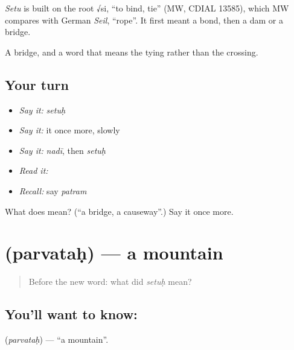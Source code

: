 \begin{cousinweb}
\emph{Setu} is built on the root √si, \textquotedblleft{}to bind, tie\textquotedblright{} (MW, CDIAL 13585), which MW compares with German \emph{Seil}, \textquotedblleft{}rope\textquotedblright{}. It first meant a bond, then a dam or a bridge.
\end{cousinweb}

\begin{grammarlens}[title={What you've built}]
A bridge, and a word that means the tying rather than the crossing.
\end{grammarlens}

\subsection*{Your turn}
\begin{itemize}
\raggedright
  \item \emph{Say it:} \emph{setuḥ}
  \item \emph{Say it:} it once more, slowly
  \item \emph{Say it:} \emph{nadī}, then \emph{setuḥ}
  \item \emph{Read it:} \textbf{}
  \item \emph{Recall:} say \emph{patram}
\end{itemize}

\begin{tcolorbox}[breakable,colback=teal!4,colframe=teal!35!black,title={Before you move on}]
What does  mean? (\textquotedblleft{}a bridge, a causeway\textquotedblright{}.) Say it once more.
\end{tcolorbox}
\section[\texorpdfstring{\sk{पर्वतः} (parvataḥ)}{पर्वतः (parvataḥ)}]{ (parvataḥ) — a mountain}

\label{lesson:SA-C33-mountain}



\begin{quote}
Before the new word: what did \emph{setuḥ} mean?
\end{quote}

\subsection*{You'll want to know: }
\textbf{} (\emph{parvataḥ}) — \textquotedblleft{}a mountain\textquotedblright{}.

